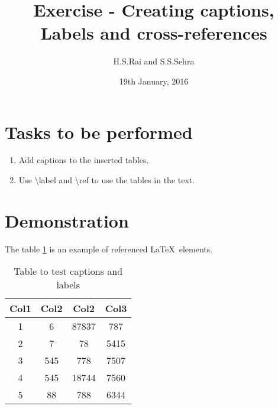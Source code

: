 \documentclass{article}
\title{Exercise - Creating captions, Labels and cross-references}
\author{H.S.Rai and S.S.Sehra}
\date{19th January, 2016}
\begin{document}
	\maketitle	
	\section*{Tasks to be performed}
	\begin{enumerate}	
		\item Add captions to the inserted tables.
		\item Use \textbackslash label and \textbackslash ref to use the tables in the text.
	\end{enumerate}
	\section*{Demonstration}
		
	The table \ref{table:1} is an example of   referenced \LaTeX\ elements.
	
	\begin{table}[h!]
		\centering
		\begin{tabular}{||c c c c||} 
			\hline
			Col1 & Col2 & Col2 & Col3 \\ 
			\hline\hline
			1 & 6 & 87837 & 787 \\ 
			2 & 7 & 78 & 5415 \\
			3 & 545 & 778 & 7507 \\
			4 & 545 & 18744 & 7560 \\
			5 & 88 & 788 & 6344 \\  
			\hline
		\end{tabular}
		\caption{Table to test captions and labels}
		\label{table:1}
	\end{table}
	
	
	
	
\end{document}
